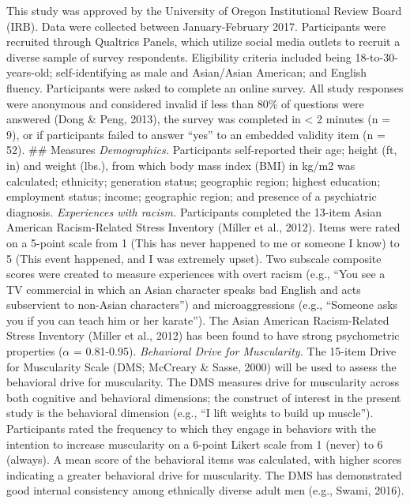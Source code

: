 \documentclass[
  english,
  man, fleqn, noextraspace,floatsintext]{apa6}
\begin{document}
This study was approved by the University of Oregon Institutional Review Board (IRB). Data were collected between January-February 2017. Participants were recruited through Qualtrics Panels, which utilize social media outlets to recruit a diverse sample of survey respondents. Eligibility criteria included being 18-to-30-years-old; self-identifying as male and Asian/Asian American; and English fluency. Participants were asked to complete an online survey. All study responses were anonymous and considered invalid if less than 80\% of questions were answered (Dong \& Peng, 2013), the survey was completed in \textless{} 2 minutes (n = 9), or if participants failed to answer ``yes'' to an embedded validity item (n = 52).
\#\# Measures
\emph{Demographics.} Participants self-reported their age; height (ft, in) and weight (lbs.), from which body mass index (BMI) in kg/m2 was calculated; ethnicity; generation status; geographic region; highest education; employment status; income; geographic region; and presence of a psychiatric diagnosis.
\emph{Experiences with racism.} Participants completed the 13-item Asian American Racism-Related Stress Inventory (Miller et al., 2012). Items were rated on a 5-point scale from 1 (This has never happened to me or someone I know) to 5 (This event happened, and I was extremely upset). Two subscale composite scores were created to measure experiences with overt racism (e.g., ``You see a TV commercial in which an Asian character speaks bad English and acts subservient to non-Asian characters'') and microaggressions (e.g., ``Someone asks you if you can teach him or her karate''). The Asian American Racism-Related Stress Inventory (Miller et al., 2012) has been found to have strong psychometric properties (\(\alpha\) = 0.81-0.95).
\emph{Behavioral Drive for Muscularity.} The 15-item Drive for Muscularity Scale (DMS; McCreary \& Sasse, 2000) will be used to assess the behavioral drive for muscularity. The DMS measures drive for muscularity across both cognitive and behavioral dimensions; the construct of interest in the present study is the behavioral dimension (e.g., ``I lift weights to build up muscle''). Participants rated the frequency to which they engage in behaviors with the intention to increase muscularity on a 6-point Likert scale from 1 (never) to 6 (always). A mean score of the behavioral items was calculated, with higher scores indicating a greater behavioral drive for muscularity. The DMS has demonstrated good internal consistency among ethnically diverse adult men (e.g., Swami, 2016).
\end{document}
